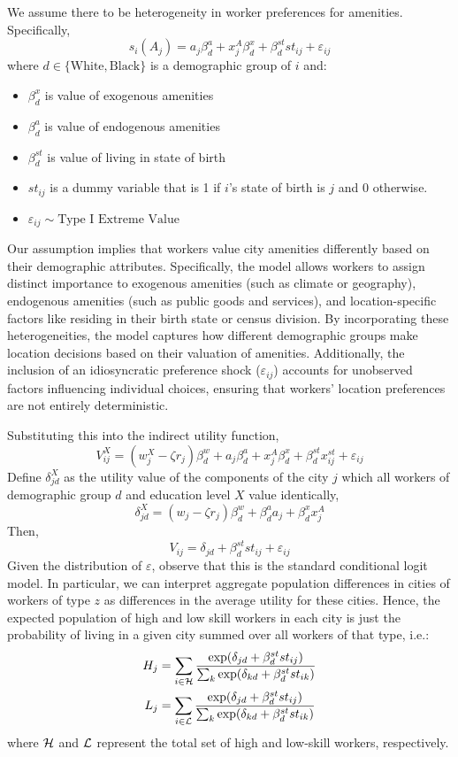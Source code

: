 \documentclass{article}
\begin{document}
 

We assume there to be heterogeneity in worker preferences for amenities. Specifically,
\begin{equation}\label{eq_worker_amenities}
    s_i(A_{j}) = a_{j}\beta_d^a + x_{j}^A\beta_d^x + \beta_d^{st}st_{ij} +  \varepsilon_{ij}
\end{equation}
where $d\in\{\text{White}, \text{Black}\}$ is a demographic group of $i$ and:
\begin{itemize}
    \item $\beta_d^x$ is value of exogenous amenities
    \item $\beta_d^{a}$ is value of endogenous amenities
    \item $\beta_d^{st}$ is value of living in state of birth 
    \item $st_{ij}$ is a dummy variable that is 1 if $i$'s state of birth is $j$ and 0 otherwise.
    \item $\varepsilon_{ij}\sim\text{Type I Extreme Value}$
\end{itemize}
Our assumption implies that workers value city amenities differently based on their demographic attributes. Specifically, the model allows workers to assign distinct importance to exogenous amenities (such as climate or geography), endogenous amenities (such as public goods and services), and location-specific factors like residing in their birth state or census division. By incorporating these heterogeneities, the model captures how different demographic groups make location decisions based on their valuation of amenities. Additionally, the inclusion of an idiosyncratic preference shock ($\varepsilon_{ij}$) accounts for unobserved factors influencing individual choices, ensuring that workers' location preferences are not entirely deterministic.


Substituting this into the indirect utility function,
$$V_{ij}^X = (w_{j}^X-\zeta r_{j})\beta^w_d  + a_{j}\beta_d^a + x_{j}^A\beta_d^x + \beta_d^{st}x_{ij}^{st} + \varepsilon_{ij}$$ 
Define $\delta_{jd}^X$ as the utility value of the components of the city $j$ which all workers of demographic group $d$ and education level $X$ value identically,
$$\delta_{jd}^X = (w_{j} - \zeta r_{j})\beta_d^w + \beta^a_d a_{j} + \beta^x_d x_{j}^A$$
Then,
$$V_{ij} = \delta_{jd} + \beta^{st}_d st_{ij} + \varepsilon_{ij}$$
Given the distribution of $\varepsilon$, observe that this is the standard conditional logit model. In particular, we can interpret aggregate population differences in cities of workers of type $z$ as differences in the average utility for these cities. Hence, the expected population of high and low skill workers in each city is just the probability of living in a given city summed over all workers of that type, i.e.: 
\begin{align}
H_{j} &= \sum_{i\in\mathcal{H}} \frac{\exp(\delta_{jd} + \beta_d^{st}st_{ij})}{\sum_{k} \exp(\delta_{kd} + \beta_d^{st}st_{ik})} \\
L_{j} &= \sum_{i\in\mathcal{L}} \frac{\exp(\delta_{jd} + \beta_d^{st}st_{ij})}{\sum_{k} \exp(\delta_{kd} + \beta_d^{st}st_{ik})}
\end{align}
where $\mathcal{H}$ and $\mathcal{L}$ represent the total set of high and low-skill workers, respectively.
\end{document}

